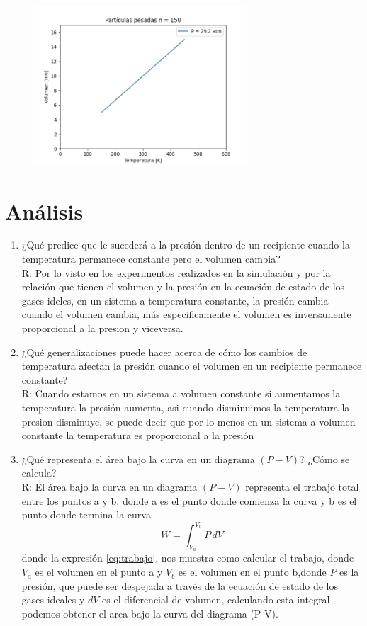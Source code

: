 \documentclass[a4paper, 12p]{article}
\begin{document}
\begin{figure}[H]
	\raggedright
	\includegraphics[width=8cm, height=6cm]{graficos/grafico9.pdf}
\end{figure}


\section{Análisis}
\begin{enumerate}
      \item ¿Qué predice que le sucederá a la presión dentro de un recipiente cuando la temperatura permanece constante pero el volumen cambia?\\
             R: Por lo visto en los experimentos realizados en la simulación y por la relación que tienen el volumen y la presión en la ecuación de estado de                los gases ideles, en un sistema a temperatura constante, la presión cambia cuando el volumen cambia, más especificamente el volumen es inversamente proporcional a la presion y viceversa.\\   
       \item ¿Qué generalizaciones puede hacer acerca de cómo los cambios de temperatura afectan la presión cuando el volumen en un recipiente permanece                                        constante?\\
             R: Cuando estamos en un sistema a volumen constante si aumentamos la temperatura la presión aumenta, asi cuando disminuimos la temperatura la presion disminuye, se puede decir que por lo menos en un sistema a volumen constante la temperatura es proporcional a la presión\\ 
      \item ¿Qué representa el área bajo la curva en un diagrama $(P-V)$? ¿Cómo se calcula?\\
             R: El área bajo la curva en un diagrama $(P-V)$ representa el trabajo total entre los puntos a y b, donde a es el punto donde comienza la curva y b es el punto donde termina la curva
             \begin{equation}\label{eq:trabajo}
             W = \int_{V_a}^{V_b} \! P \, dV 
             \end{equation}
             donde la expresión \ref{eq:trabajo}, nos muestra como calcular el trabajo, donde $V_a$ es el volumen en el punto a y $V_b$ es el volumen en el punto b,donde $P$ es la presión, que puede ser despejada a través de la ecuación de estado de los gases ideales y $dV$ es el diferencial de volumen, calculando esta integral podemos obtener el area bajo la curva del diagrama (P-V).\\ 
\end{enumerate}
\end{document}
